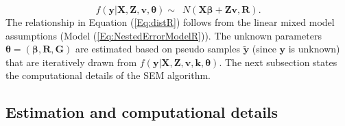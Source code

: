 \begin{equation}
\label{Eq:distR}
f\left(\mathbf{y}|\mathbf{X}, \mathbf{Z}, \mathbf{v}, \boldsymbol{\theta}\right)  \sim \enspace N\left(\mathbf{X}\boldsymbol{\beta}+\mathbf{Z}\mathbf{v}, \mathbf{R}\right). 
\end{equation}
The relationship in Equation (\ref{Eq:distR}) follows from the linear mixed model assumptions (Model (\ref{Eq:NestedErrorModelR})). The unknown parameters  \(\boldsymbol{\theta}=\left(\boldsymbol{\beta},\mathbf{R},\mathbf{G}\right)\) are estimated based on pseudo samples \(\mathbf{\tilde{y}}\) (since \(\mathbf{y}\) is unknown) that are iteratively drawn from  \(f\left(\mathbf{y}|\mathbf{X}, \mathbf{Z}, \mathbf{v}, \mathbf{k}, \boldsymbol{\theta}\right)\). The next subsection states the computational details of the SEM algorithm.

\subsection{Estimation and computational details}

